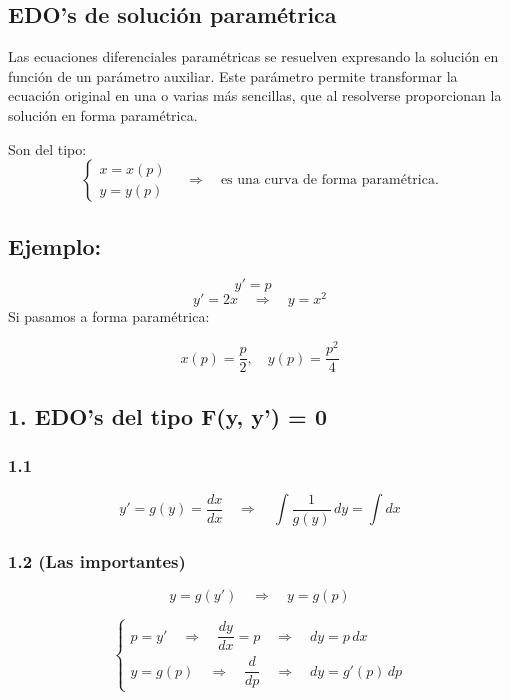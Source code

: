 \documentclass[a4paper,12pt]{article}
\begin{document}
\subsection{EDO's de solución paramétrica}
\noindent
Las ecuaciones diferenciales paramétricas se resuelven expresando 
la solución en función de un parámetro auxiliar. Este parámetro 
permite transformar la ecuación original en una o varias más sencillas, 
que al resolverse proporcionan la solución en forma paramétrica.

\medskip
\noindent
Son del tipo:
\[
\begin{cases}
x = x(p)\\ 
y = y(p)
\end{cases}
\quad \Rightarrow \quad
\text{es una curva de forma paramétrica.}
\]

\subsection*{Ejemplo:}
\vspace{-1.2em}
\[
y' = p \quad 
\]
\[
y' = 2x \quad \Rightarrow \quad y = x^2
\]
Si pasamos a forma paramétrica:

\[
x(p) = \frac{p}{2}, \quad y(p) = \frac{p^2}{4}
\]

\newpage
\subsection*{1. EDO's del tipo F(y, y') = 0}

\subsubsection*{1.1}
\vspace{-1.2em}
\[
y' = g(y) = \frac{dx}{dx} \quad \Rightarrow \quad \int \frac{1}{g(y)}\, dy = \int dx
\]

\subsubsection*{1.2 (Las importantes)}
\vspace{-1.2em}
\[
y = g(y') \quad \Rightarrow \quad y = g(p)
\]

\[
\begin{cases}
p = y' \quad \Rightarrow \quad \dfrac{dy}{dx} = p \quad \Rightarrow \quad dy = p\, dx \\[8pt]
y = g(p) \quad \Rightarrow \quad \dfrac{d}{dp} \quad \Rightarrow \quad dy = g'(p)\, dp
\end{cases}
\]
\end{document}
